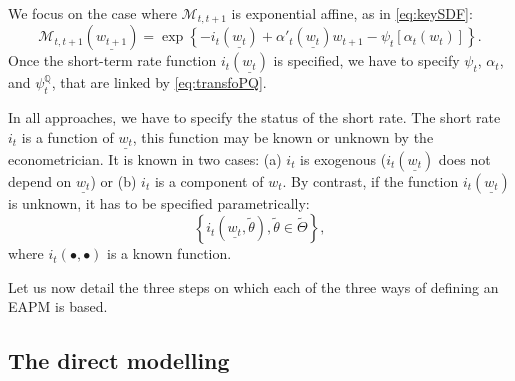 \documentclass[
  12pt,
]{book}
\theoremstyle{definition}
\theoremstyle{definition}
\theoremstyle{definition}
\theoremstyle{definition}
\theoremstyle{remark}
\begin{document}
We focus on the case where \(\mathcal{M}_{t,t+1}\) is exponential affine, as in \eqref{eq:keySDF}:
\[
\mathcal{M}_{t,t+1} (\underline{w_{t+1}}) = \exp\left\{ -i_{t} (\underline{w_t}) + \alpha'_t(\underline{w_t})w_{t+1} - \psi_t [\alpha_t (w_t)]\right\}.
\]
Once the short-term rate function \(i_{t}(\underline{w_t})\) is specified, we have to specify \(\psi_t\), \(\alpha_t\), and \(\psi^{\mathbb{Q}}_t\), that are linked by \eqref{eq:transfoPQ}.

In all approaches, we have to specify the status of the short rate. The short rate \(i_{t}\) is a function of \(\underline{w_t}\), this function may be known or unknown by the econometrician. It is known in two cases: (a) \(i_{t}\) is exogenous (\(i_{t}(\underline{w_t})\) does not depend on \(\underline{w_t}\)) or (b) \(i_{t}\) is a component of \(w_t\). By contrast, if the function \(i_{t} (\underline{w_t})\) is unknown, it has to be specified parametrically:
\[
\left\{ i_{t} (\underline{w_t}, \tilde{\theta}), \tilde{\theta}\in \tilde{\Theta} \right\},
\]
where \(i_{t}(\bullet,\bullet)\) is a known function.

Let us now detail the three steps on which each of the three ways of defining an EAPM is based.

\hypertarget{DirectModeling}{%
\subsection{The direct modelling}\label{DirectModeling}}
\end{document}
